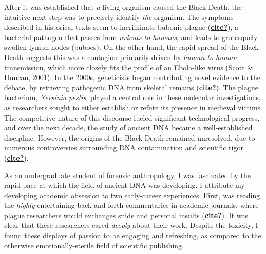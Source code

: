 \documentclass[
]{report}
\begin{document}
After it was established that \emph{a} living organism caused the Black
Death, the intuitive next step was to precisely identify \emph{the}
organism. The symptoms described in historical texts seem to incriminate
bubonic plague (\protect\hyperlink{ref-cite}{\textbf{cite?}}), a
bacterial pathogen that passes from \emph{rodents to humans}, and leads
to grotesquely swollen lymph nodes (buboes). On the other hand, the
rapid spread of the Black Death suggests this was a contagion primarily
driven by \emph{human to human} transmission, which more closely fits
the profile of an Ebola-like virus
(\protect\hyperlink{ref-scott2001BiologyPlaguesEvidence}{Scott \&
Duncan, 2001}). In the 2000s, geneticists began contributing novel
evidence to the debate, by retrieving pathogenic DNA from skeletal
remains (\protect\hyperlink{ref-cite}{\textbf{cite?}}). The plague
bacterium, \emph{Yersinia pestis}, played a central role in these
molecular investigations, as researchers sought to either establish or
refute its presence in medieval victims. The competitive nature of this
discourse fueled significant technological progress, and over the next
decade, the study of ancient DNA became a well-established discipline.
However, the origins of the Black Death remained unresolved, due to
numerous controversies surrounding DNA contamination and scientific
rigor (\protect\hyperlink{ref-cite}{\textbf{cite?}}).

As an undergraduate student of forensic anthropology, I was fascinated
by the rapid pace at which the field of ancient DNA was developing. I
attribute my developing academic obsession to two early-career
experiences. First, was reading the \emph{highly} entertaining
back-and-forth commentaries in academic journals, where plague
researchers would exchanges snide and personal insults
(\protect\hyperlink{ref-cite}{\textbf{cite?}}). It was clear that these
researchers cared \emph{deeply} about their work. Despite the toxicity,
I found these displays of passion to be engaging and refreshing, as
compared to the otherwise emotionally-sterile field of scientific
publishing.
\end{document}
